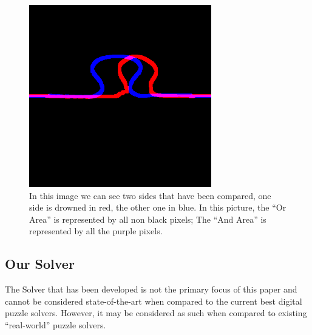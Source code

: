 \documentclass{article}
\begin{document}
\begin{figure}[htbp]
  \centering
  \begin{minipage}[t]{0.44\textwidth}
    \vspace{3pt} %
    \includegraphics[width=\textwidth]{pictures/side_comparation.png}
  \end{minipage}
  \hfill
  \begin{minipage}[t]{0.54\textwidth}
    \caption{\newline
    In this image we can see two sides that have been
    compared, one side is drowned in red, the other one in blue.
    In this picture, the “Or Area” is represented by all non
    black pixels; The “And Area” is represented by all the
    purple pixels.}
  \end{minipage}
\end{figure}
\clearpage



\subsection{Our Solver}\label{document:my_solver}
The Solver that has been developed is not the primary focus of this
paper and cannot be considered state-of-the-art when compared
to the current best digital puzzle solvers. However, it may be
considered as such when compared to existing ``real-world'' puzzle solvers.
\end{document}
